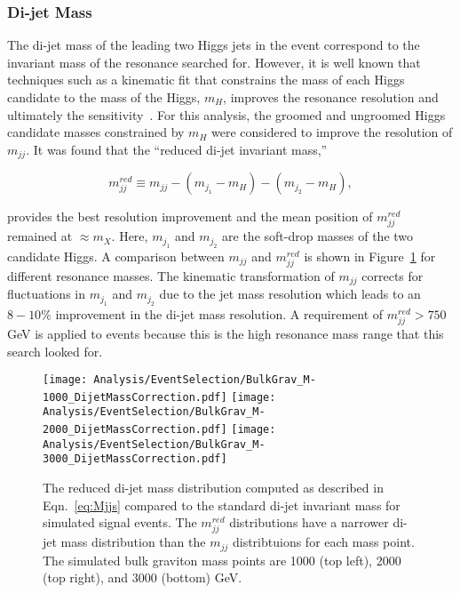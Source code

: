 \subsubsection{Di-jet Mass}
\label{sec:DijetMass}

The di-jet mass of the leading two Higgs jets in the event correspond to the invariant mass of the resonance searched for. However, it is well known that techniques such as a kinematic fit that constrains the mass of each Higgs candidate to the mass of the Higgs, $m_{H}$, improves the resonance resolution and ultimately the sensitivity~\cite{CMS-PAS-B2G-16-008}. For this analysis, the groomed and ungroomed Higgs candidate masses constrained by $m_{H}$ were considered to improve the resolution of $m_{jj}$. It was found that the ``reduced di-jet invariant mass,''

\begin{equation}
m_{jj}^{red} \equiv m_{jj} - (m_{j_{1}}-m_{H}) - (m_{j_{2}}-m_{H}),
\label{eq:Mjjs}
\end{equation}

\noindent
provides the best resolution improvement and the mean position of $m_{jj}^{red}$ remained at $\approx m_{X}$. Here, $m_{j_{1}}$ and $m_{j_{2}}$ are the soft-drop masses of the two candidate Higgs. A comparison between $m_{jj}$ and $m_{jj}^{red}$ is shown in Figure~\ref{fig:subtImp} for different resonance masses. The kinematic transformation of $m_{jj}$ corrects for fluctuations in $m_{j_{1}}$ and $m_{j_{2}}$ due to the jet mass resolution which leads to an $8-10\%$ improvement in the di-jet mass resolution. A requirement of $m_{jj}^{red}>750$ GeV is applied to events because this is the high resonance mass range that this search looked for.

\begin{figure}[h!]
\begin{center}
\texttt{[image: Analysis/EventSelection/BulkGrav\_M-1000\_DijetMassCorrection.pdf]}
\texttt{[image: Analysis/EventSelection/BulkGrav\_M-2000\_DijetMassCorrection.pdf]}
\texttt{[image: Analysis/EventSelection/BulkGrav\_M-3000\_DijetMassCorrection.pdf]}
\end{center}
\caption{The reduced di-jet mass distribution computed as described in Eqn.~\ref{eq:Mjjs} compared to the standard di-jet invariant mass for simulated signal events. The $m_{jj}^{red}$ distributions have a narrower di-jet mass distribution than the $m_{jj}$ distribtuions for each mass point. The simulated bulk graviton mass points are 1000 (top left), 2000 (top right), and 3000 (bottom) GeV.}
\label{fig:subtImp}
\end{figure}



